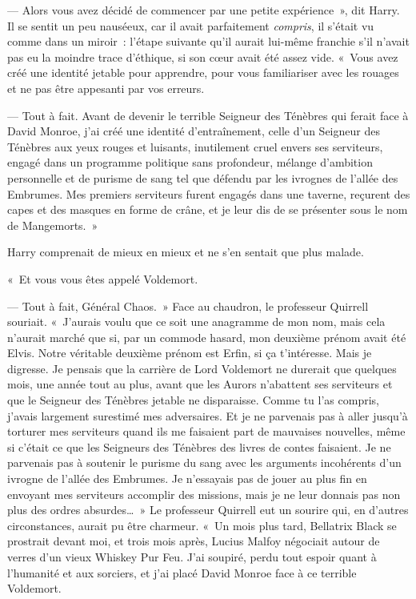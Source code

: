 --- Alors vous avez décidé de commencer par une petite expérience~», dit Harry.
Il se sentit un peu nauséeux, car il avait parfaitement \emph{compris}, il s'était vu comme dans un miroir~: l'étape suivante qu'il aurait lui-même franchie s'il n'avait pas eu la moindre trace d'éthique, si son cœur avait été assez vide.
«~Vous avez créé une identité jetable pour apprendre, pour vous familiariser avec les rouages et ne pas être appesanti par vos erreurs.

--- Tout à fait.
Avant de devenir le terrible Seigneur des Ténèbres qui ferait face à David Monroe, j'ai créé une identité d'entraînement, celle d'un Seigneur des Ténèbres aux yeux rouges et luisants, inutilement cruel envers ses serviteurs, engagé dans un programme politique sans profondeur, mélange d'ambition personnelle et de purisme de sang tel que défendu par les ivrognes de l'allée des Embrumes.
Mes premiers serviteurs furent engagés dans une taverne, reçurent des capes et des masques en forme de crâne, et je leur dis de se présenter sous le nom de Mangemorts.~»

Harry comprenait de mieux en mieux et ne s'en sentait que plus malade.

«~Et vous vous êtes appelé Voldemort.

--- Tout à fait, Général Chaos.~»
Face au chaudron, le professeur Quirrell souriait.
«~J'aurais voulu que ce soit une anagramme de mon nom, mais cela n'aurait marché que si, par un commode hasard, mon deuxième prénom avait été Elvis.
Notre véritable deuxième prénom est Erfin, si ça t'intéresse.
Mais je digresse.
Je pensais que la carrière de Lord Voldemort ne durerait que quelques mois, une année tout au plus, avant que les Aurors n'abattent ses serviteurs et que le Seigneur des Ténèbres jetable ne disparaisse.
Comme tu l'as compris, j'avais largement surestimé mes adversaires.
Et je ne parvenais pas à aller jusqu'à torturer mes serviteurs quand ils me faisaient part de mauvaises nouvelles, même si c'était ce que les Seigneurs des Ténèbres des livres de contes faisaient.
Je ne parvenais pas à soutenir le purisme du sang avec les arguments incohérents d'un ivrogne de l'allée des Embrumes.
Je n'essayais pas de jouer au plus fin en envoyant mes serviteurs accomplir des missions, mais je ne leur donnais pas non plus des ordres absurdes…~»
Le professeur Quirrell eut un sourire qui, en d'autres circonstances, aurait pu être charmeur.
«~Un mois plus tard, Bellatrix Black se prostrait devant moi, et trois mois après, Lucius Malfoy négociait autour de verres d'un vieux Whiskey Pur Feu.
J'ai soupiré, perdu tout espoir quant à l'humanité et aux sorciers, et j'ai placé David Monroe face à ce terrible Voldemort.

